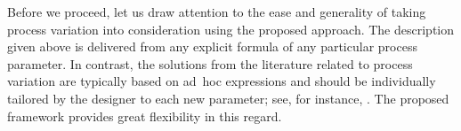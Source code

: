 Before we proceed, let us draw attention to the ease and generality of taking
process variation into consideration using the proposed approach. The
description given above is delivered from any explicit formula of any particular
process parameter. In contrast, the solutions from the literature related to
process variation are typically based on ad~hoc expressions and should be
individually tailored by the designer to each new parameter; see, for instance,
\cite{ghanta2006, bhardwaj2008, huang2009a}. The proposed framework provides
great flexibility in this regard.
